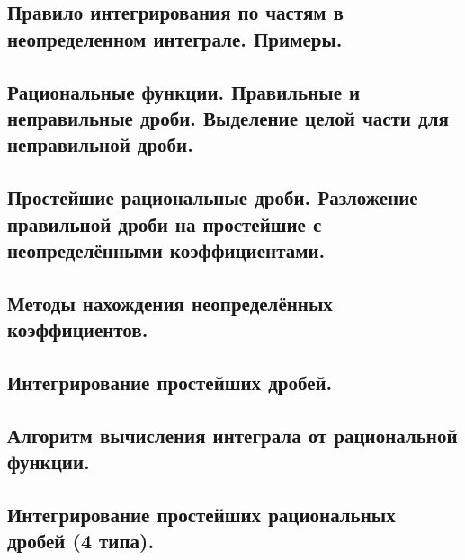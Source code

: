 \documentclass[a4paper,12pt]{article}
\theoremstyle{plain} %
\theoremstyle{definition} %
\theoremstyle{remark} %
\begin{document}
\subsection*{Правило интегрирования по частям в неопределенном интеграле. Примеры.}

\newpage
{}
\subsection*{Рациональные функции. Правильные и неправильные дроби. Выделение целой части для неправильной дроби.}

\newpage
{}
\subsection*{Простейшие рациональные дроби. Разложение правильной дроби на простейшие с неопределёнными коэффициентами.}

\newpage
{}
\subsection*{Методы нахождения неопределённых коэффициентов.}

\newpage
{}
\subsection*{Интегрирование простейших дробей.}

\newpage
{}
\subsection*{Алгоритм вычисления интеграла от рациональной функции.}

\newpage
{}
\subsection*{Интегрирование простейших рациональных дробей (4 типа).}
\end{document}
